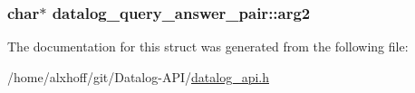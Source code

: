\subsubsection[{\texorpdfstring{arg2}{arg2}}]{\setlength{\rightskip}{0pt plus 5cm}char$\ast$ datalog\+\_\+query\+\_\+answer\+\_\+pair\+::arg2}\hypertarget{structdatalog__query__answer__pair_a10bde40ebdb18cef34e13cb413a92de1}{}\label{structdatalog__query__answer__pair_a10bde40ebdb18cef34e13cb413a92de1}


The documentation for this struct was generated from the following file\+:\begin{DoxyCompactItemize}
\item 
/home/alxhoff/git/\+Datalog-\/\+A\+P\+I/\hyperlink{datalog__api_8h}{datalog\+\_\+api.\+h}\end{DoxyCompactItemize}
